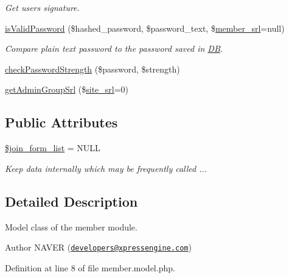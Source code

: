 \begin{DoxyCompactItemize}
\begin{DoxyCompactList}\small\item\em Get user\textquotesingle{}s signature. \end{DoxyCompactList}\item 
\hyperlink{classmemberModel_a5d2727323d47e4304998311424bb4091}{is\+Valid\+Password} (\$hashed\+\_\+password, \$password\+\_\+text, \$\hyperlink{ko_8install_8php_aa61f9e08f0fe505094d26f8143f30bbd}{member\+\_\+srl}=null)
\begin{DoxyCompactList}\small\item\em Compare plain text password to the password saved in \hyperlink{classDB}{D\+B}. \end{DoxyCompactList}\item 
\hyperlink{classmemberModel_a5970b2dcba76f9fc910cc3df7de19ac7}{check\+Password\+Strength} (\$password, \$strength)
\item 
\hyperlink{classmemberModel_ad8c1aafe9a4f461404b596ff6ad3e2ed}{get\+Admin\+Group\+Srl} (\$\hyperlink{ko_8install_8php_a8b1406b4ad1048041558dce6bfe89004}{site\+\_\+srl}=0)
\end{DoxyCompactItemize}
\subsection*{Public Attributes}
\begin{DoxyCompactItemize}
\item 
\hyperlink{classmemberModel_aa9b942e17ed74955c8700dd74d75d2b2}{\$join\+\_\+form\+\_\+list} = N\+U\+L\+L
\begin{DoxyCompactList}\small\item\em Keep data internally which may be frequently called ... \end{DoxyCompactList}\end{DoxyCompactItemize}


\subsection{Detailed Description}
Model class of the member module. 

\begin{DoxyAuthor}{Author}
N\+A\+V\+E\+R (\href{mailto:developers@xpressengine.com}{\tt developers@xpressengine.\+com}) 
\end{DoxyAuthor}


Definition at line 8 of file member.\+model.\+php.



